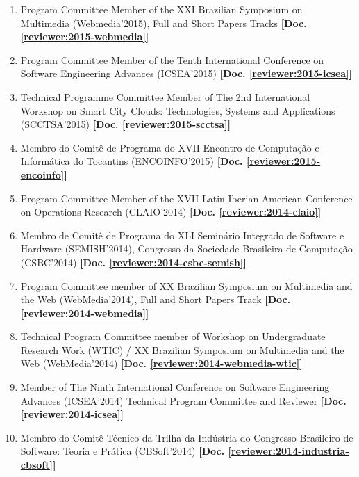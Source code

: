 \documentclass[a4paper,oneside,10pt]{article}
\begin{document}
\begin{enumerate}
    \item Program Committee Member of the XXI Brazilian Symposium on Multimedia (Webmedia'2015), Full and Short Papers Tracks \textbf{[Doc. \ref{reviewer:2015-webmedia}]}

    \item Program Committee Member of the Tenth International Conference on Software Engineering Advances (ICSEA'2015) \textbf{[Doc. \ref{reviewer:2015-icsea}]}

    \item Technical Programme Committee Member of The 2nd International Workshop on Smart City Clouds: Technologies, Systems and Applications (SCCTSA'2015) \textbf{[Doc. \ref{reviewer:2015-scctsa}]}

    \item Membro do Comitê de Programa do XVII Encontro de Computação e Informática do Tocantins (ENCOINFO'2015) \textbf{[Doc. \ref{reviewer:2015-encoinfo}]}

    \item Program Committee Member of the XVII Latin-Iberian-American Conference on Operations Research (CLAIO'2014) \textbf{[Doc. \ref{reviewer:2014-claio}]}

    \item Membro de Comitê de Programa do XLI Seminário Integrado de Software e Hardware (SEMISH'2014), Congresso da Sociedade Brasileira de Computação (CSBC'2014) \textbf{[Doc. \ref{reviewer:2014-csbc-semish}]}

    \item Program Committee member of XX Brazilian Symposium on Multimedia and the Web (WebMedia'2014), Full and Short Papers Track \textbf{[Doc. \ref{reviewer:2014-webmedia}]}

    \item Technical Program Committee member of Workshop on Undergraduate Research Work (WTIC) / XX Brazilian Symposium on Multimedia and the Web (WebMedia'2014) \textbf{[Doc. \ref{reviewer:2014-webmedia-wtic}]}

    \item Member of The Ninth International Conference on Software Engineering Advances (ICSEA'2014) Technical Program Committee and Reviewer \textbf{[Doc. \ref{reviewer:2014-icsea}]}

    \item Membro do Comitê Técnico da Trilha da Indústria do Congresso Brasileiro de Software: Teoria e Prática (CBSoft'2014) \textbf{[Doc. \ref{reviewer:2014-industria-cbsoft}]}


\end{enumerate}
\end{document}
